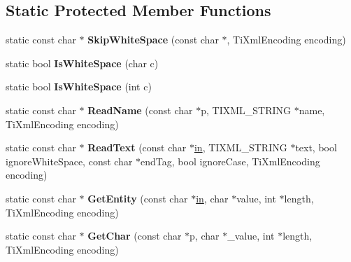 \subsection*{Static Protected Member Functions}
\begin{DoxyCompactItemize}
\item 
\hypertarget{classTiXmlBase_ac0c3d66d8a9e6996a1fa016275e16875}{static const char $\ast$ {\bfseries Skip\-White\-Space} (const char $\ast$, Ti\-Xml\-Encoding encoding)}\label{classTiXmlBase_ac0c3d66d8a9e6996a1fa016275e16875}

\item 
\hypertarget{classTiXmlBase_af56296d561c0bab4bc8e198cdcf5c48e}{static bool {\bfseries Is\-White\-Space} (char c)}\label{classTiXmlBase_af56296d561c0bab4bc8e198cdcf5c48e}

\item 
\hypertarget{classTiXmlBase_a3de391ea9f4c4a8aa10d04480b048795}{static bool {\bfseries Is\-White\-Space} (int c)}\label{classTiXmlBase_a3de391ea9f4c4a8aa10d04480b048795}

\item 
\hypertarget{classTiXmlBase_a1c21a6ab5f7b503acd91f35f183734b3}{static const char $\ast$ {\bfseries Read\-Name} (const char $\ast$p, T\-I\-X\-M\-L\-\_\-\-S\-T\-R\-I\-N\-G $\ast$name, Ti\-Xml\-Encoding encoding)}\label{classTiXmlBase_a1c21a6ab5f7b503acd91f35f183734b3}

\item 
\hypertarget{classTiXmlBase_aa646c74921aa33156968b802bbf5566e}{static const char $\ast$ {\bfseries Read\-Text} (const char $\ast$\hyperlink{structin}{in}, T\-I\-X\-M\-L\-\_\-\-S\-T\-R\-I\-N\-G $\ast$text, bool ignore\-White\-Space, const char $\ast$end\-Tag, bool ignore\-Case, Ti\-Xml\-Encoding encoding)}\label{classTiXmlBase_aa646c74921aa33156968b802bbf5566e}

\item 
\hypertarget{classTiXmlBase_ac5c08bf3deffcda0bf8ce2958372b584}{static const char $\ast$ {\bfseries Get\-Entity} (const char $\ast$\hyperlink{structin}{in}, char $\ast$value, int $\ast$length, Ti\-Xml\-Encoding encoding)}\label{classTiXmlBase_ac5c08bf3deffcda0bf8ce2958372b584}

\item 
\hypertarget{classTiXmlBase_a5b0fde72d6f662ae1fd6303195d2159b}{static const char $\ast$ {\bfseries Get\-Char} (const char $\ast$p, char $\ast$\-\_\-value, int $\ast$length, Ti\-Xml\-Encoding encoding)}\label{classTiXmlBase_a5b0fde72d6f662ae1fd6303195d2159b}


\end{DoxyCompactItemize}
